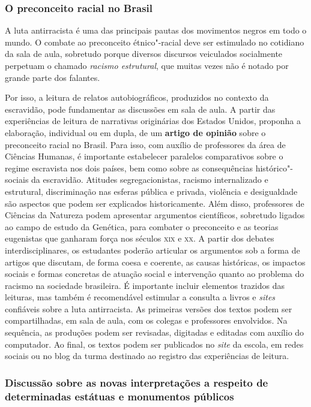 \documentclass[11pt]{extarticle}
\begin{document}
\subsubsection{O preconceito racial no Brasil}


  A luta antirracista é uma das principais pautas dos movimentos negros
  em todo o mundo. O combate ao preconceito étnico"-racial deve ser
  estimulado no cotidiano da sala de aula, sobretudo porque diversos
  discursos veiculados socialmente perpetuam o chamado \emph{racismo
  estrutural}, que muitas vezes não é notado por grande parte dos
  falantes. 

  Por isso, a leitura de relatos autobiográficos, produzidos
  no contexto da escravidão, pode fundamentar as discussões em sala de
  aula. A partir das experiências de leitura de narrativas originárias
  dos Estados Unidos, proponha a elaboração, individual ou em dupla, de
  um \textbf{artigo de opinião} sobre o preconceito racial no Brasil.
  Para isso, com auxílio de professores da área de Ciências Humanas, é
  importante estabelecer paralelos comparativos sobre o regime
  escravista nos dois países, bem como sobre as consequências
  histórico"-sociais da escravidão. Atitudes segregacionistas, racismo
  internalizado e estrutural, discriminação nas esferas pública e
  privada, violência e desigualdade são aspectos que podem ser
  explicados historicamente. Além disso, professores de Ciências da
  Natureza podem apresentar argumentos científicos, sobretudo ligados ao
  campo de estudo da Genética, para combater o preconceito e as teorias
  eugenistas que ganharam força nos séculos \textsc{xix} e \textsc{xx}. A partir dos
  debates interdisciplinares, os estudantes poderão articular os
  argumentos sob a forma de artigos que discutam, de forma coesa e
  coerente, as causas históricas, os impactos sociais e formas concretas
  de atuação social e intervenção quanto ao problema do racismo na
  sociedade brasileira. É importante incluir elementos trazidos das
  leituras, mas também é recomendável estimular a consulta a livros e
  \emph{sites} confiáveis sobre a luta antirracista. As primeiras
  versões dos textos podem ser compartilhadas, em sala de aula, com os
  colegas e professores envolvidos. Na sequência, as produções podem ser
  revisadas, digitadas e editadas com auxílio do computador. Ao final,
  os textos podem ser publicados no \emph{site} da escola, em redes
  sociais ou no blog da turma destinado ao registro das experiências de
  leitura.

\subsubsection{Discussão sobre as novas interpretações 
a respeito de determinadas estátuas e monumentos públicos}
\end{document}
